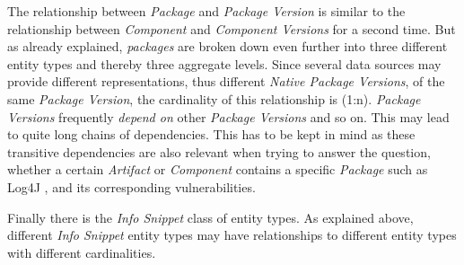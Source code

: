 The relationship between \emph{Package} and \emph{Package Version} is similar to the relationship between \emph{Component} and \emph{Component Versions} for a second time. But as already explained, \emph{packages} are broken down even further into three different entity types and thereby three aggregate levels. Since several data sources may provide different representations, thus different \emph{Native Package Versions}, of the same \emph{Package Version}, the cardinality of this relationship is (1:n). \emph{Package Versions} frequently \emph{depend on} other \emph{Package Versions} and so on. This may lead to quite long chains of dependencies. This has to be kept in mind as these transitive dependencies are also relevant when trying to answer the question, whether a certain \emph{Artifact} or \emph{Component} contains a specific \emph{Package} such as Log4J %
, and its corresponding vulnerabilities.\par
Finally there is the \emph{Info Snippet} class of entity types. As explained above, different \emph{Info Snippet} entity types may have relationships to different entity types with different cardinalities.


